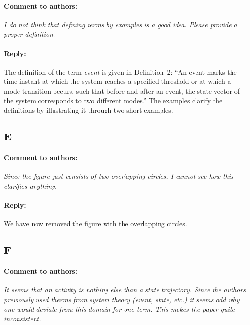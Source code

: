 \documentclass[10pt,final,a4paper,oneside,onecolumn]{article}
\newcommand{\toauthor}{\paragraph*{Comment to authors:} \itshape}
\newcommand{\fromauthor}{\paragraph*{Reply:} \normalfont}
\newcommand{\toauthornew}{\paragraph*{Comment to authors:} \itshape}
\newcommand{\fromauthornew}{\paragraph*{Reply:} \normalfont}
\begin{document}
\toauthornew I do not think that defining terms by examples is a good idea. Please provide a proper definition.

\fromauthornew The definition of the term \emph{event} is given in Definition~2: ``An event marks the time instant at which the system reaches a specified threshold or at which a mode transition occurs, such that before and after an event, the state vector of the system corresponds to two different modes.'' The examples clarify the definitions by illustrating it through two short examples.



\subsection*{E}

%

\toauthornew Since the figure just consists of two overlapping circles, I cannot see how this clarifies anything.

\fromauthornew We have now removed the figure with the overlapping circles.



\subsection*{F}

%

\toauthornew It seems that an activity is nothing else than a state trajectory. Since the authors previously used therms from system theory (event, state, etc.) it seems odd why one would deviate from this domain for one term. This makes the paper quite inconsistent. 
\end{document}
